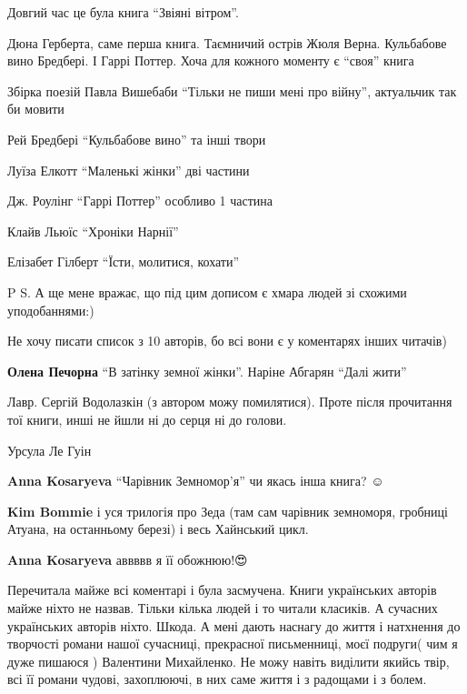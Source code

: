 Довгий час це була книга \enquote{Звіяні вітром}.


Дюна Герберта, саме перша книга. Таємничий острів Жюля Верна. Кульбабове вино
Бредбері. І Гаррі Поттер. Хоча для кожного моменту є \enquote{своя} книга


Збірка поезій Павла Вишебаби \enquote{Тільки не пиши мені про війну}, актуальчик так би мовити


Рей Бредбері \enquote{Кульбабове вино} та інші твори

Луїза Елкотт \enquote{Маленькі жінки} дві частини

Дж. Роулінг \enquote{Гаррі Поттер} особливо 1 частина

Клайв Льюїс \enquote{Хроніки Нарнії}

Елізабет Гілберт \enquote{Їсти, молитися, кохати}

P S. А ще мене вражає, що під цим дописом є хмара людей зі схожими уподобаннями:)

Не хочу писати список з 10 авторів, бо всі вони є у коментарях інших читачів)

\textbf{Олена Печорна} \enquote{В затінку земної жінки}. Наріне Абгарян \enquote{Далі жити}


Лавр. Сергій Водолазкін (з автором можу помилятися). Проте після прочитання тої
книги, инші не йшли ні до серця ні до голови.


Урсула Ле Гуін

\begin{itemize} %
\textbf{Anna Kosaryeva} \enquote{Чарівник Земномор'я} чи якась інша книга? ☺️

\textbf{Kim Bommie} і уся трилогія про Зеда (там сам чарівник земноморя, гробниці Атуана, на останньому березі) і весь Хайнський цикл.

\textbf{Anna Kosaryeva} аввввв я її обожнюю!😍🥰
\end{itemize} %


Перечитала майже всі коментарі і була засмучена. Книги українських авторів
майже ніхто не назвав. Тільки кілька людей і то читали класиків. А сучасних
українських авторів ніхто. Шкода. А мені дають наснагу до життя і натхнення до
творчості романи нашої сучасниці, прекрасної письменниці, моєї подруги( чим я
дуже пишаюся ) Валентини Михайленко. Не можу навіть виділити якийсь твір, всі
її романи чудові, захоплюючі, в них саме життя і з радощами і з болем.
